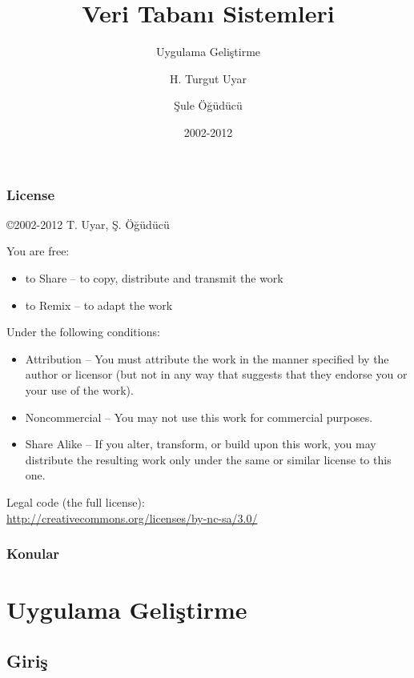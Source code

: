 \documentclass[dvipsnames]{beamer}
\title{Veri Tabanı Sistemleri}
\subtitle{Uygulama Geliştirme}
\author{H. Turgut Uyar \and Şule Öğüdücü}
\date{2002-2012}
\theoremstyle{definition}
\theoremstyle{example}
\theoremstyle{plain}
\begin{document}
\begin{frame}
  \titlepage
\end{frame}

\begin{frame}
  \frametitle{License}

  \hfill
  \copyright 2002-2012 T. Uyar, Ş. Öğüdücü

  \vfill
  \begin{tiny}
    You are free:
    \begin{itemize}
      \item to Share -- to copy, distribute and transmit the work
      \item to Remix -- to adapt the work
    \end{itemize}

    Under the following conditions:
    \begin{itemize}
      \item Attribution -- You must attribute the work in the manner specified by
        the author or licensor (but not in any way that suggests that they
        endorse you or your use of the work).

      \item Noncommercial -- You may not use this work for commercial purposes.

      \item Share Alike -- If you alter, transform, or build upon this work, you
        may distribute the resulting work only under the same or similar license
        to this one.
    \end{itemize}
  \end{tiny}

  \vfill
  Legal code (the full license):\\
  \url{http://creativecommons.org/licenses/by-nc-sa/3.0/}
\end{frame}

\begin{frame}
  \frametitle{Konular}
  \tableofcontents
\end{frame}

\section{Uygulama Geliştirme}

\lstset{language=C}

\subsection{Giriş}
\end{document}

